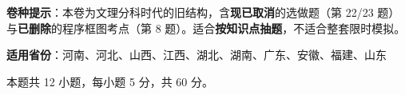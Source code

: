 

\begin{gknotice}
\textbf{ 卷种提示}：本卷为文理分科时代的旧结构，含\textbf{现已取消}的选做题（第 22/23 题）与\textbf{已删除}的程序框图考点（第 8 题）。适合\textbf{按知识点抽题}，不适合整套限时模拟。

\textbf{适用省份}：河南、河北、山西、江西、湖北、湖南、广东、安徽、福建、山东
\end{gknotice}

\par\medskip


\begin{gktip}
本题共 12 小题，每小题 5 分，共 60 分。
\end{gktip}

